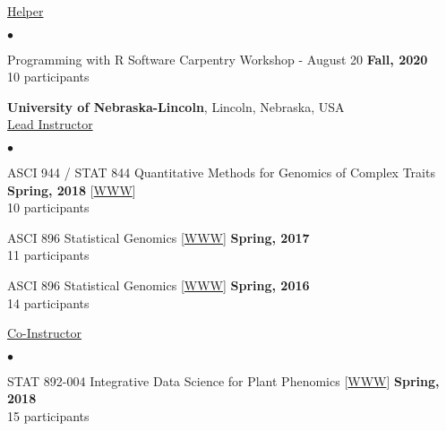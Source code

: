 \documentclass[margin,line,10pt]{res}
\newenvironment{list2}{
  \begin{list}{$\bullet$}{%
      \setlength{\itemsep}{0in}
      \setlength{\parsep}{0in} \setlength{\parskip}{0in}
      \setlength{\topsep}{0in} \setlength{\partopsep}{0in} 
      \setlength{\leftmargin}{0.2in}}}{\end{list}}
\begin{document}
\begin{resume}
 \vspace{0.3cm}


\underline{Helper}
 \vspace{0.4cm}
 \begin{list2}
 \item Programming with R Software Carpentry Workshop - August 20  \hfill {\bf Fall, 2020} \\
   10  participants 
\end{list2}

 
      \vspace{1cm}


{\bf University of Nebraska-Lincoln}, Lincoln, Nebraska, USA  \vspace{0.2cm} \\
\underline{Lead Instructor}
\vspace{0.4cm}
\begin{list2}

\item ASCI 944 / STAT 844 Quantitative Methods for Genomics of Complex Traits
  \hfill {\bf Spring, 2018} 
         [\textcolor{blue}{\href{http://morotalab.org/asci944-2018/ASCI944.html}{WWW}}] \\
         10  participants %

   \vspace{0.5cm}

\item ASCI 896 Statistical Genomics [\textcolor{blue}{\href{http://morotalab.org/asci896-2017/ASCI896.html}{WWW}}]
  \hfill {\bf Spring, 2017} \\
  11  participants   %

  \vspace{0.5cm}

\item ASCI 896 Statistical Genomics [\textcolor{blue}{\href{http://morotalab.org/asci896-2016/ASCI896.html}{WWW}}]
  \hfill {\bf Spring, 2016} \\
14 participants %

\end{list2}
\vspace{.01pt}
        

\underline{Co-Instructor} 
\vspace{0.4cm}
\begin{list2}
  
\item STAT 892-004 Integrative Data Science for Plant Phenomics [\textcolor{blue}{\href{http://morotalab.org/stat892-2018/STAT892.html}{WWW}}]
  \hfill {\bf Spring, 2018} \\
  15 participants 


\end{list2}
\end{resume}
\end{document}
